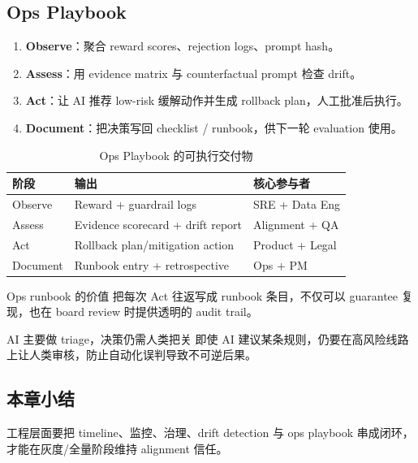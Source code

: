 \subsection{Ops Playbook}

\begin{enumerate}
    \item \textbf{Observe}：聚合 reward scores、rejection logs、prompt hash。
    \item \textbf{Assess}：用 evidence matrix 与 counterfactual prompt 检查 drift。
    \item \textbf{Act}：让 AI 推荐 low-risk 缓解动作并生成 rollback plan，人工批准后执行。
    \item \textbf{Document}：把决策写回 checklist / runbook，供下一轮 evaluation 使用。
\end{enumerate}

\begin{table}[H]
\centering
\begin{tabular}{p{} p{} p{}}
\toprule
阶段 & 输出 & 核心参与者 \\
\midrule
Observe & Reward + guardrail logs & SRE + Data Eng \\
Assess & Evidence scorecard + drift report & Alignment + QA \\
Act & Rollback plan/mitigation action & Product + Legal \\
Document & Runbook entry + retrospective & Ops + PM \\
\bottomrule
\end{tabular}
\caption{Ops Playbook 的可执行交付物}
\end{table}

\begin{knowledgebox}{Ops runbook 的价值}
把每次 Act 往返写成 runbook 条目，不仅可以 guarantee 复现，也在 board review 时提供透明的 audit trail。
\end{knowledgebox}

\begin{warningbox}{AI 主要做 triage，决策仍需人类把关}
即使 AI 建议某条规则，仍要在高风险线路上让人类审核，防止自动化误判导致不可逆后果。
\end{warningbox}

\subsection{本章小结}

工程层面要把 timeline、监控、治理、drift detection 与 ops playbook 串成闭环，才能在灰度/全量阶段维持 alignment 信任。


